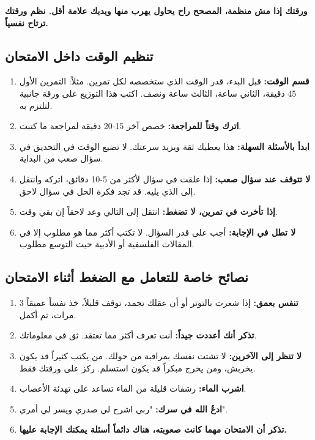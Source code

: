 \documentclass[12pt,a4paper]{book}
\newcommand{\importantAr}[1]{%
	\begin{important}
		\bfseries #1
	\end{important}
}
\begin{document}
	\importantAr{ورقتك إذا مش منظمة، المصحح راح يحاول يهرب منها ويديك علامة أقل. نظم ورقتك ترتاح نفسياً.}
	
	\subsection{تنظيم الوقت داخل الامتحان}
	\begin{enumerate}
		\item \textbf{قسم الوقت:} قبل البدء، قدر الوقت الذي ستخصصه لكل تمرين. مثلاً: التمرين الأول 45 دقيقة، الثاني ساعة، الثالث ساعة ونصف. اكتب هذا التوزيع على ورقة جانبية لتلتزم به.
		\item \textbf{اترك وقتاً للمراجعة:} خصص آخر 15-20 دقيقة لمراجعة ما كتبت.
		\item \textbf{ابدأ بالأسئلة السهلة:} هذا يعطيك ثقة ويزيد سرعتك. لا تضيع الوقت في التحديق في سؤال صعب من البداية.
		\item \textbf{لا تتوقف عند سؤال صعب:} إذا علقت في سؤال لأكثر من 5-10 دقائق، اتركه وانتقل إلى الذي يليه. قد تجد فكرة الحل في سؤال لاحق.
		\item \textbf{إذا تأخرت في تمرين، لا تضغط:} انتقل إلى التالي وعد لاحقاً إن بقي وقت.
		\item \textbf{لا تطل في الإجابة:} أجب على قدر السؤال. لا تكتب أكثر مما هو مطلوب إلا في المقالات الفلسفية أو الأدبية حيث التوسع مطلوب.
	\end{enumerate}
	
	\subsection{نصائح خاصة للتعامل مع الضغط أثناء الامتحان}
	\label{sec:random-tips19}
	\begin{enumerate}
		\item \textbf{تنفس بعمق:} إذا شعرت بالتوتر أو أن عقلك تجمد، توقف قليلاً، خذ نفساً عميقاً 3 مرات، ثم أكمل.
		\item \textbf{تذكر أنك أعددت جيداً:} أنت تعرف أكثر مما تعتقد. ثق في معلوماتك.
		\item \textbf{لا تنظر إلى الآخرين:} لا تشتت نفسك بمراقبة من حولك. من يكتب كثيراً قد يكون يخربش، ومن يخرج مبكراً قد يكون استسلم. ركز على ورقتك فقط.
		\item \textbf{اشرب الماء:} رشفات قليلة من الماء تساعد على تهدئة الأعصاب.
		\item \textbf{ادعُ الله في سرك:} "ربي اشرح لي صدري ويسر لي أمري".
		\item \textbf{تذكر أن الامتحان مهما كانت صعوبته، هناك دائماً أسئلة يمكنك الإجابة عليها.}
	\end{enumerate}
	
\end{document}

